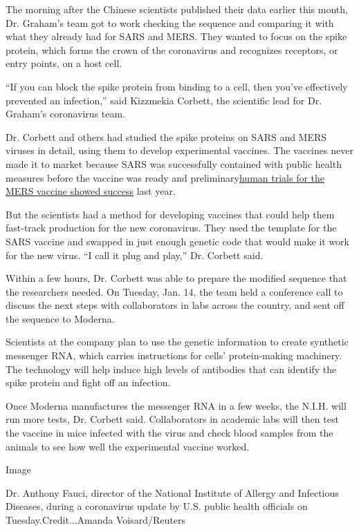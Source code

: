 The morning after the Chinese scientists published their data earlier
this month, Dr. Graham's team got to work checking the sequence and
comparing it with what they already had for SARS and MERS. They wanted
to focus on the spike protein, which forms the crown of the coronavirus
and recognizes receptors, or entry points, on a host cell.

``If you can block the spike protein from binding to a cell, then you've
effectively prevented an infection,'' said Kizzmekia Corbett, the
scientific lead for Dr. Graham's coronavirus team.

Dr. Corbett and others had studied the spike proteins on SARS and MERS
viruses in detail, using them to develop experimental vaccines. The
vaccines never made it to market because SARS was successfully contained
with public health measures before the vaccine was ready and
preliminary\href{https://www.thelancet.com/journals/laninf/article/PIIS1473-3099(19)30266-X/fulltext}{human
trials for the MERS vaccine showed success} last year.

But the scientists had a method for developing vaccines that could help
them fast-track production for the new coronavirus. They used the
template for the SARS vaccine and swapped in just enough genetic code
that would make it work for the new virus. ``I call it plug and play,''
Dr. Corbett said.

Within a few hours, Dr. Corbett was able to prepare the modified
sequence that the researchers needed. On Tuesday, Jan. 14, the team held
a conference call to discuss the next steps with collaborators in labs
across the country, and sent off the sequence to Moderna.

Scientists at the company plan to use the genetic information to create
synthetic messenger RNA, which carries instructions for cells'
protein-making machinery. The technology will help induce high levels of
antibodies that can identify the spike protein and fight off an
infection.

Once Moderna manufactures the messenger RNA in a few weeks, the N.I.H.
will run more tests, Dr. Corbett said. Collaborators in academic labs
will then test the vaccine in mice infected with the virus and check
blood samples from the animals to see how well the experimental vaccine
worked.

Image

Dr. Anthony Fauci, director of the National Institute of Allergy and
Infectious Diseases, during a coronavirus update by U.S. public health
officials on Tuesday.Credit...Amanda Voisard/Reuters

